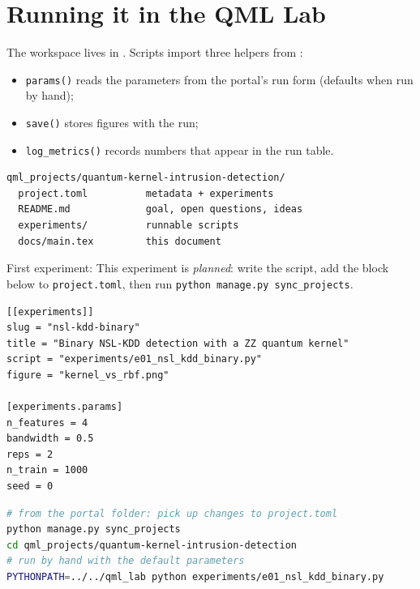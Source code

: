 \documentclass[11pt,a4paper]{article}
\begin{document}
\section{Running it in the QML Lab}
The workspace lives in . Scripts import three helpers from
:
\begin{itemize}
  \item \texttt{params()} reads the parameters from the portal's run form (defaults when run by hand);
  \item \texttt{save()} stores figures with the run;
  \item \texttt{log\_metrics()} records numbers that appear in the run table.
\end{itemize}

\begin{lstlisting}
qml_projects/quantum-kernel-intrusion-detection/
  project.toml          metadata + experiments
  README.md             goal, open questions, ideas
  experiments/          runnable scripts
  docs/main.tex         this document
\end{lstlisting}

First experiment: This experiment is \emph{planned}: write the script, add the block below to \texttt{project.toml}, then run \texttt{python manage.py sync\_projects}.

\begin{lstlisting}[language={}]
[[experiments]]
slug = "nsl-kdd-binary"
title = "Binary NSL-KDD detection with a ZZ quantum kernel"
script = "experiments/e01_nsl_kdd_binary.py"
figure = "kernel_vs_rbf.png"

[experiments.params]
n_features = 4
bandwidth = 0.5
reps = 2
n_train = 1000
seed = 0
\end{lstlisting}

\begin{lstlisting}[language=bash]
# from the portal folder: pick up changes to project.toml
python manage.py sync_projects
cd qml_projects/quantum-kernel-intrusion-detection
# run by hand with the default parameters
PYTHONPATH=../../qml_lab python experiments/e01_nsl_kdd_binary.py
\end{lstlisting}

\end{document}
